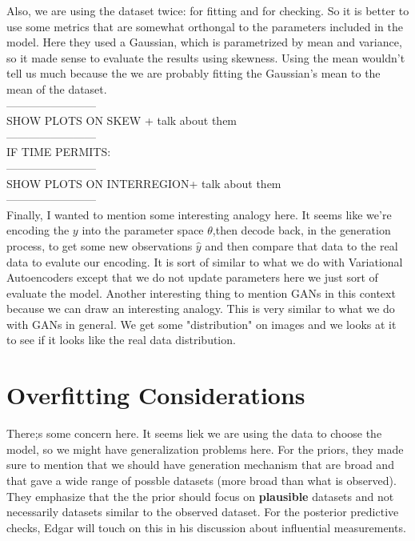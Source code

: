 \documentclass[]{article}
\begin{document}
Also, we are using the dataset twice: for fitting and for checking. So it is better to use some metrics that are somewhat orthongal to the parameters included in the model. Here they used a Gaussian, which is parametrized by mean and variance, so it made sense to evaluate the results using skewness. Using the mean wouldn't tell us much because the we are probably fitting the Gaussian's mean to the mean of the dataset.  \\
------------------------ \\SHOW PLOTS ON SKEW + talk about them\\ ------------------------\\
IF TIME PERMITS: \\ 
------------------------\\ SHOW PLOTS ON INTERREGION+ talk about them \\------------------------\\

Finally, I wanted to mention some interesting analogy here. It seems like we're encoding the $y$ into the parameter space $\theta$,then decode back, in the generation process, to get some new observations $\hat{y}$ and then compare that data to the real data to evalute our encoding. It is sort of similar to what we do with Variational Autoencoders except that we do not update parameters here we just sort of evaluate the model. Another interesting thing to mention GANs in this context because we can draw an interesting analogy. This is very similar to what we do with GANs in general. We get some "distribution" on images and we looks at it to see if it looks like the real data distribution.

\section*{Overfitting Considerations}
There;s some concern here. It seems liek we are using the data to choose the model,  so we might have generalization problems here. For the priors, they made sure to mention that we should have generation mechanism that are broad and that gave a wide range of possble datasets (more broad than what is observed). They emphasize that the the prior should focus on \textbf{plausible} datasets and not necessarily datasets similar to the observed dataset. For the posterior predictive checks, Edgar will touch on this in his discussion about influential measurements.
\end{document}
